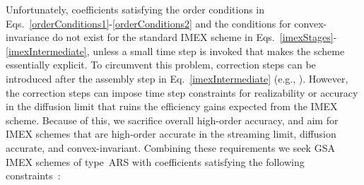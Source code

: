 Unfortunately, coefficients satisfying the order conditions in Eqs.~\eqref{orderConditions1}-\eqref{orderConditions2} and the conditions for convex-invariance do not exist for the standard IMEX scheme in Eqs.~\eqref{imexStages}-\eqref{imexIntermediate}, unless a small time step is invoked that makes the scheme essentially explicit.  
To circumvent this problem, correction steps can be introduced after the assembly step in Eq.~\eqref{imexIntermediate} (e.g., \cite{chertock_etal_2015,hu_etal_2018}).  
However, the correction steps can impose time step constraints for realizability or accuracy in the diffusion limit that ruins the efficiency gains expected from the IMEX scheme.  
Because of this, we sacrifice overall high-order accuracy, and aim for IMEX schemes that are high-order accurate in the streaming limit, diffusion accurate, and convex-invariant.  
Combining these requirements we seek GSA IMEX schemes of type~ARS with coefficients satisfying the following constraints~\cite{hu_etal_2018,chu_etal_2018}:

